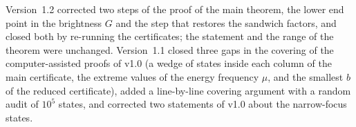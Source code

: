 Version~1.2 corrected two steps of the proof of the main theorem, the lower end point in the brightness $G$ and the step that restores the sandwich factors, and closed both by re-running the certificates; the statement and the range of the theorem were unchanged.
Version~1.1 closed three gaps in the covering of the computer-assisted proofs of v1.0 (a wedge of states inside each column of the main certificate, the extreme values of the energy frequency $\mu$, and the smallest $b$ of the reduced certificate), added a line-by-line covering argument with a random audit of $10^5$ states, and corrected two statements of v1.0 about the narrow-focus states.
